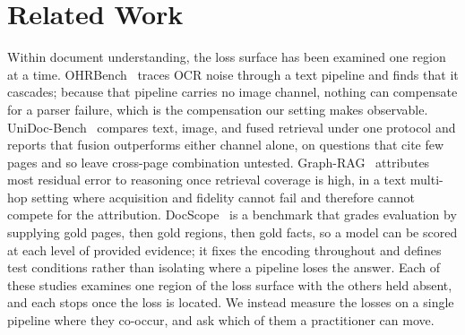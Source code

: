 \documentclass[11pt]{article}
\begin{document}
\section{Related Work}
\label{sec:relatedwork}

Within document understanding, the loss surface has been examined one region at a time. OHRBench~\cite{zhang2025ohrbench} traces OCR noise through a text pipeline and finds that it cascades; because that pipeline carries no image channel, nothing can compensate for a parser failure, which is the compensation our setting makes observable. UniDoc-Bench~\cite{peng2025unidocbench} compares text, image, and fused retrieval under one protocol and reports that fusion outperforms either channel alone, on questions that cite few pages and so leave cross-page combination untested. Graph-RAG~\cite{zarrinkia2026reasoningbottleneck} attributes most residual error to reasoning once retrieval coverage is high, in a text multi-hop setting where acquisition and fidelity cannot fail and therefore cannot compete for the attribution. DocScope~\cite{feng2026docscope} is a benchmark that grades evaluation by supplying gold pages, then gold regions, then gold facts, so a model can be scored at each level of provided evidence; it fixes the encoding throughout and defines test conditions rather than isolating where a pipeline loses the answer.
Each of these studies examines one region of the loss surface with the others held absent, and each stops once the loss is located. We instead measure the losses on a single pipeline where they co-occur, and ask which of them a practitioner can move.
\end{document}
